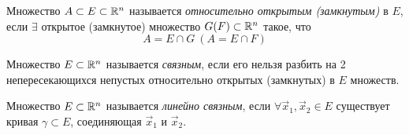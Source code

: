 \begin{definition}
	Множество $A \subset E \subset \mathbb{R}^n$ называется \textit{относительно открытым (замкнутым)} в $E$, если $\exists$ открытое (замкнутое) множество $G (F) \subset \mathbb{R}^n$ такое, что
	\[
		A = E \cap G\ (A = E \cap F)
	\]
\end{definition}

\begin{definition}
	Множество $E \subset \mathbb{R}^n$ называется \textit{связным}, если его нельзя разбить на 2 непересекающихся непустых относительно открытых (замкнутых) в $E$ множеств.
\end{definition}

\begin{definition}
	Множество $E \subset \mathbb{R}^n$ называется \textit{линейно связным}, если $\forall \vec{x}_1, \vec{x}_2 \in E$ существует кривая $\gamma \subset E$, соединяющая $\vec{x}_1$ и $\vec{x}_2$.
\end{definition}